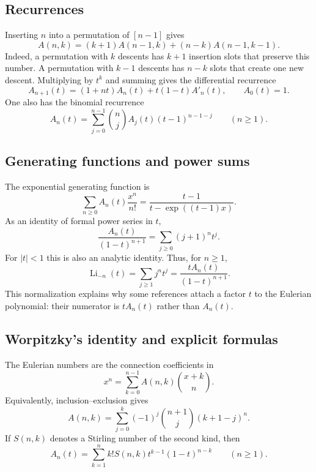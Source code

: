 \subsection[eulerianRecurrences]{Recurrences}

Inserting $n$ into a permutation of $[n-1]$ gives
\begin{equation}
 A(n,k)=(k+1)A(n-1,k)+(n-k)A(n-1,k-1).
\end{equation}
Indeed, a permutation with $k$ descents has $k+1$ insertion slots that
preserve this number.  A permutation with $k-1$ descents has $n-k$ slots
that create one new descent.
Multiplying by $t^k$ and summing gives the differential recurrence
\begin{equation}
 A_{n+1}(t)=(1+nt)A_n(t)+t(1-t)A'_n(t),
 \qquad A_0(t)=1.
\end{equation}
One also has the binomial recurrence
\[
 A_n(t)=\sum_{j=0}^{n-1}\binom{n}{j}A_j(t)(t-1)^{n-1-j}
 \qquad(n\geq1).
\]


\subsection[eulerianGeneratingFunctions]{Generating functions and power sums}

The exponential generating function is
\begin{equation}
 \sum_{n\geq0}A_n(t)\frac{x^n}{n!}
 =\frac{t-1}{t-\exp((t-1)x)}.
\end{equation}
As an identity of formal power series in $t$,
\begin{equation}
 \frac{A_n(t)}{(1-t)^{n+1}}
 =\sum_{j\geq0}(j+1)^n t^j.
\end{equation}
For $|t|<1$ this is also an analytic identity.  Thus, for $n\geq1$,
\[
 \operatorname{Li}_{-n}(t)
 =\sum_{j\geq1}j^nt^j
 =\frac{tA_n(t)}{(1-t)^{n+1}}.
\]
This normalization explains why some references attach a factor $t$ to the
Eulerian polynomial: their numerator is $tA_n(t)$ rather than $A_n(t)$.


\subsection[eulerianWorpitzky]{Worpitzky's identity and explicit formulas}

The Eulerian numbers are the connection coefficients in
\begin{equation}
 x^n=\sum_{k=0}^{n-1}A(n,k)\binom{x+k}{n}.
\end{equation}
Equivalently, inclusion--exclusion gives
\begin{equation}
 A(n,k)=\sum_{j=0}^{k}(-1)^j\binom{n+1}{j}(k+1-j)^n.
\end{equation}
If $S(n,k)$ denotes a Stirling number of the second kind, then
\begin{equation}
 A_n(t)=\sum_{k=1}^{n}k!S(n,k)t^{k-1}(1-t)^{n-k}
 \qquad(n\geq1).
\end{equation}


